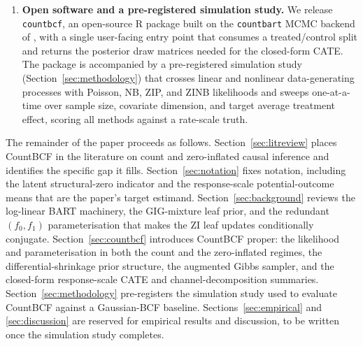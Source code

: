 \documentclass[11pt]{article}
\theoremstyle{plain}
\theoremstyle{definition}
\theoremstyle{remark}
\newcommand{\fzeroSym}{f_{0}}
\newcommand{\foneSym}{f_{1}}
\newcommand{\Deltalam}{\Delta\lambda}
\newcommand{\Deltapzi}{\Delta p_{\mathrm{zi}}}
\begin{document}
\begin{enumerate}
    of the forests at any covariate value, the response-scale
    conditional treatment effect is available without any additional
    Monte Carlo step: it is a deterministic function of the stored
    forest values. We report per-unit posterior means, $50\%$ and
    $95\%$ credible intervals, and population-averaged ATE summaries,
    all on the response scale. In the zero-inflated case the same
    posterior draws produce a per-unit decomposition of the CATE into
    a count-rate channel $\Deltalam(x)$ and a structural-zero channel
    $\Deltapzi(x)$.
  \item \textbf{Open software and a pre-registered simulation study.}
    We release \texttt{countbcf}, an open-source R package built on
    the \texttt{countbart} MCMC backend of \citet{wikle2023causal},
    with a single user-facing entry point that consumes a
    treated/control split and returns the posterior draw matrices
    needed for the closed-form CATE. The package is accompanied by a
    pre-registered simulation study (Section~\ref{sec:methodology})
    that crosses linear and nonlinear data-generating processes with
    Poisson, NB, ZIP, and ZINB likelihoods and sweeps one-at-a-time
    over sample size, covariate dimension, and target average
    treatment effect, scoring all methods against a rate-scale truth.
\end{enumerate}

The remainder of the paper proceeds as follows.
Section~\ref{sec:litreview} places CountBCF in the literature on
count and zero-inflated causal inference and identifies the specific
gap it fills. Section~\ref{sec:notation} fixes notation, including
the latent structural-zero indicator and the response-scale
potential-outcome means that are the paper's target estimand.
Section~\ref{sec:background} reviews the log-linear BART machinery,
the GIG-mixture leaf prior, and the redundant $(\fzeroSym, \foneSym)$
parameterisation that makes the ZI leaf updates conditionally
conjugate. Section~\ref{sec:countbcf} introduces CountBCF proper: the
likelihood and parameterisation in both the count and the
zero-inflated regimes, the differential-shrinkage prior structure,
the augmented Gibbs sampler, and the closed-form response-scale CATE
and channel-decomposition summaries.
Section~\ref{sec:methodology} pre-registers the simulation study used
to evaluate CountBCF against a Gaussian-BCF baseline.
Sections~\ref{sec:empirical} and \ref{sec:discussion} are reserved
for empirical results and discussion, to be written once the
simulation study completes.
\end{document}
